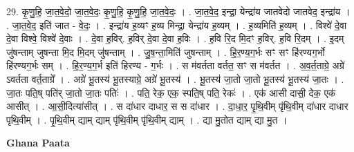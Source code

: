 \documentclass[17pt]{extarticle}
\begin{document}
29. कृ॒णु॒हि॒ जा॒त॒वे॒दो॒ जा॒त॒वे॒दः॒ कृ॒णु॒हि॒ कृ॒णु॒हि॒ जा॒त॒वे॒दः॒ । . जा॒त॒वे॒द॒ इन्द्रा॒ येन्द्रा॑य जातवेदो जातवेद॒ इन्द्रा॑य । . जा॒त॒वे॒द॒ इति॑ जात - वे॒दः॒ । . इन्द्रा॑य ह॒व्यꣳ ह॒व्य मिन्द्रा॒ येन्द्रा॑य ह॒व्यम् । . ह॒व्यमिति॑ ह॒व्यम् । . विश्वे॑ दे॒वा दे॒वा विश्वे॒ विश्वे॑ दे॒वाः । . दे॒वा ह॒विर्. ह॒विर् दे॒वा दे॒वा ह॒विः । . ह॒वि रि॒द मि॒दꣳ ह॒विर्. ह॒वि रि॒दम् । . इ॒दम् जु॑षन्ताम् जुषन्ता मि॒द मि॒दम् जु॑षन्ताम् । . जु॒ष॒न्ता॒मिति॑ जुषन्ताम् । . हि॒र॒ण्य॒ग॒र्भः सꣳ सꣳ हि॑रण्यग॒र्भो हि॑रण्यग॒र्भः सम् । . हि॒र॒ण्य॒ग॒र्भ इति॑ हिरण्य - ग॒र्भः । . स म॑वर्तता वर्तत॒ सꣳ स म॑वर्तत । . अ॒व॒र्त॒ताग्रे॒ अग्रे॑ ऽवर्तता वर्त॒ताग्रे᳚ । . अग्रे॑ भू॒तस्य॑ भू॒तस्याग्रे॒ अग्रे॑ भू॒तस्य॑ । . भू॒तस्य॑ जा॒तो जा॒तो भू॒तस्य॑ भू॒तस्य॑ जा॒तः । . जा॒तः पति॒ष् पति॑र् जा॒तो जा॒तः पतिः॑ । . पति॒ रेक॒ एक॒ स्पति॒ष् पति॒ रेकः॑ । . एक॑ आसी दासी॒ देक॒ एक॑ आसीत् । . आ॒सी॒दित्या॑सीत् । . स दा॑धार दाधार॒ स स दा॑धार । . दा॒धा॒र॒ पृ॒थि॒वीम् पृ॑थि॒वीम् दा॑धार दाधार पृथि॒वीम् । . पृ॒थि॒वीम् द्याम् द्याम् पृ॑थि॒वीम् पृ॑थि॒वीम् द्याम् । . द्या मु॒तोत द्याम् द्या मु॒त । \newline

\textbf{Ghana Paata } \newline
\end{document}
